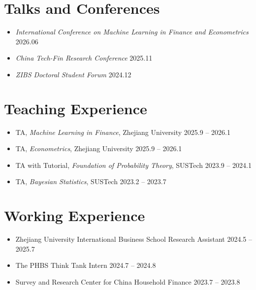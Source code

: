\documentclass[11pt, a4paper]{article}
\begin{document}
\section{Talks and Conferences}

\begin{itemize}
  \item \textit{International Conference on Machine Learning in Finance and Econometrics} \hfill 2026.06
  \item \textit{China Tech-Fin Research Conference} \hfill 2025.11
  \item \textit{ZIBS Doctoral Student Forum} \hfill 2024.12
\end{itemize}

\section{Teaching Experience}

\begin{itemize}
  \item TA, \textit{Machine Learning in Finance}, Zhejiang University \hfill 2025.9 -- 2026.1
  \item TA, \textit{Econometrics}, Zhejiang University \hfill 2025.9 -- 2026.1
  \item TA with Tutorial, \textit{Foundation of Probability Theory}, SUSTech \hfill 2023.9 -- 2024.1
  \item TA, \textit{Bayesian Statistics}, SUSTech \hfill 2023.2 -- 2023.7
\end{itemize}

\section{Working Experience}

\begin{itemize}
  \item Zhejiang University International Business School Research Assistant \hfill 2024.5 -- 2025.7
  \item The PHBS Think Tank Intern \hfill 2024.7 -- 2024.8
  \item Survey and Research Center for China Household Finance \hfill 2023.7 -- 2023.8
\end{itemize}
\end{document}
